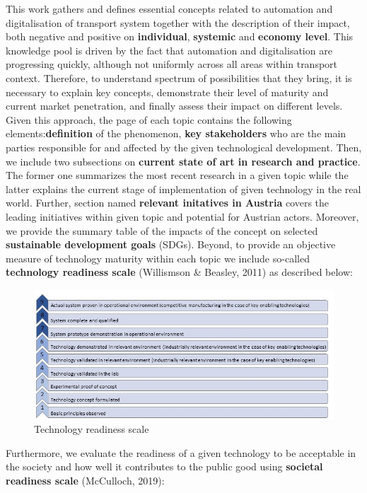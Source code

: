 \documentclass[
]{book}
\begin{document}
This work gathers and defines essential concepts related to automation and digitalisation of transport system together with the description of their impact, both negative and positive on \textbf{individual}, \textbf{systemic} and \textbf{economy level}. This knowledge pool is driven by the fact that automation and digitalisation are progressing quickly, although not uniformly across all areas within transport context. Therefore, to understand spectrum of possibilities that they bring, it is necessary to explain key concepts, demonstrate their level of maturity and current market penetration, and finally assess their impact on different levels. Given this approach, the page of each topic contains the following elements:\textbf{definition} of the phenomenon,
\textbf{key stakeholders} who are the main parties responsible for and affected by the given technological development. Then, we include two subsections on \textbf{current state of art in research and practice}. The former one summarizes the most recent research in a given topic while the latter explains the current stage of implementation of given technology in the real world. Further, section named \textbf{relevant initatives in Austria} covers the leading initiatives within given topic and potential for Austrian actors. Moreover, we provide the summary table of the impacts of the concept on selected \textbf{sustainable development goals} (SDGs). Beyond, to provide an objective measure of technology maturity within each topic we include so-called \textbf{technology readiness scale} (Willismson \& Beasley, 2011) as described below:

\begin{figure}
\includegraphics[width=0.8\linewidth]{image/TRL_1} \caption{Technology readiness scale}\label{fig:unnamed-chunk-2}
\end{figure}

Furthermore, we evaluate the readiness of a given technology to be acceptable in the society and how well it contributes to the public good using \textbf{societal readiness scale} (McCulloch, 2019):
\end{document}
